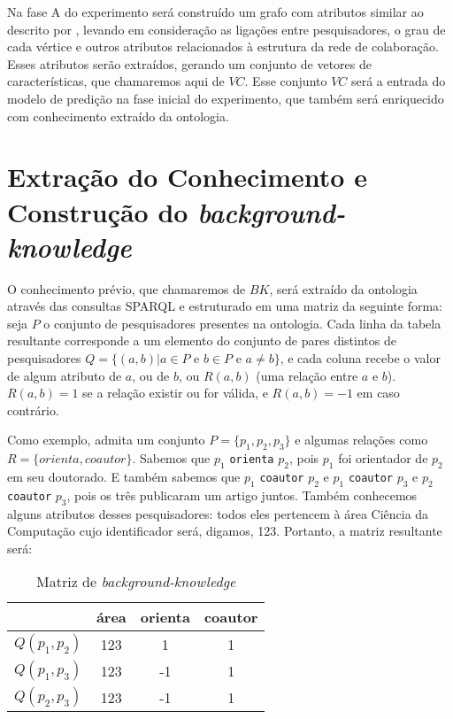 Na fase A do experimento será construído um grafo com atributos similar ao descrito por \citet{Cervantes2014}, levando em consideração as ligações entre pesquisadores, o grau de cada vértice e outros atributos relacionados à estrutura da rede de colaboração. Esses atributos serão extraídos, gerando um conjunto de vetores de características, que chamaremos aqui de $VC$. Esse conjunto $VC$ será a entrada do modelo de predição na fase inicial do experimento, que também será enriquecido com conhecimento extraído da ontologia.

\section{Extração do Conhecimento e Construção do \textit{background-knowledge}}
\label{sec:desenvolvimento-background-knowledge}

O conhecimento prévio, que chamaremos de $BK$, será extraído da ontologia através das consultas SPARQL e estruturado em uma matriz da seguinte forma: seja $P$ o conjunto de pesquisadores presentes na ontologia. Cada linha da tabela resultante corresponde a um elemento do conjunto de pares distintos de pesquisadores $Q = \{ (a, b) | a \in P \text{ e } b \in P \text{ e } a \neq b \}$, e cada coluna recebe o valor de algum atributo de $a$, ou de $b$, ou $R(a,b)$ (uma relação entre $a$ e $b$). $R(a,b) = 1$ se a relação existir ou for válida, e $R(a,b) = -1$ em caso contrário.

Como exemplo, admita um conjunto $P = \{ p_1, p_2, p_3 \}$ e algumas relações
como $R = \{ orienta, coautor \}$. Sabemos que $p_1$ \texttt{orienta} $p_2$, pois $p_1$ foi orientador de $p_2$ em seu doutorado. E também sabemos que $p_1$ \texttt{coautor} $p_2$ e $p_1$ \texttt{coautor} $p_3$ e $p_2$ \texttt{coautor} $p_3$, pois os três publicaram um artigo juntos. Também conhecemos alguns atributos desses pesquisadores: todos eles pertencem à área Ciência da Computação cujo identificador será, digamos, 123. Portanto, a matriz resultante será:

\begin{table}[h!]
    \centering
    \begin{tabular}{|c|c|c|c|}
     \hline
      & área & orienta & coautor   \\
     \hline\hline
     $Q(p_1, p_2)$ & 123 & 1  & 1  \\
     \hline
     $Q(p_1, p_3)$ & 123 & -1 & 1  \\
     \hline
     $Q(p_2, p_3)$ & 123 & -1 & 1  \\
     \hline
    \end{tabular}
    \caption{Matriz de \textit{background-knowledge} }
    \label{matriz-relacoes}
\end{table}


